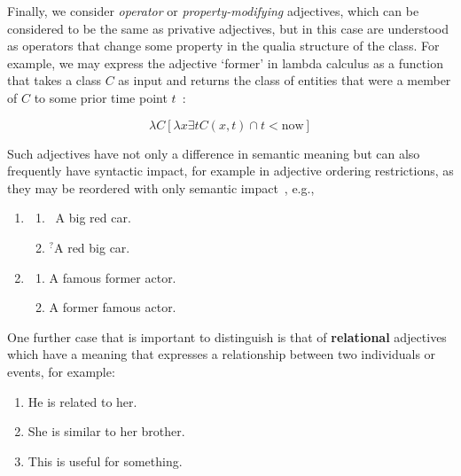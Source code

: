 \documentclass[11pt]{article}
\begin{document}
Finally, we consider \emph{operator} or \emph{property-modifying} adjectives, 
which can be considered to be the same as privative adjectives, but in this 
case are understood as operators that change some property in the qualia 
structure of the class. For example, we may express the adjective `former' 
in lambda calculus as a function that takes a class $C$ as input and returns the class 
of entities that were a member of $C$ to some prior time point $t$~\cite{partee2003there}:

$$\lambda C [\lambda x \exists t C(x,t) \cap t < \mathrm{now}]$$

Such adjectives have not only a difference in semantic meaning but can also 
frequently have syntactic impact, for example in adjective ordering 
restrictions, as they may be reordered with only semantic 
impact~\cite{teodorescu2006adjective}, e.g.,

\begin{enumerate}[resume]
\item \begin{enumerate}
\item \ A big red car.
\item $^?$A red big car.
\end{enumerate} 
\label{ex:car}
\item \begin{enumerate}
\item A famous former actor.
\item A former famous actor.
\end{enumerate}
\label{ex:actor}
\end{enumerate}

One further case that is important to distinguish is that of \textbf{relational} adjectives which have a meaning 
that expresses a relationship between two individuals or events, for example:

\begin{enumerate}[resume]
\item He is related to her.
\item She is similar to her brother. 
\item This is useful for something. 
\end{enumerate}

\end{document}
